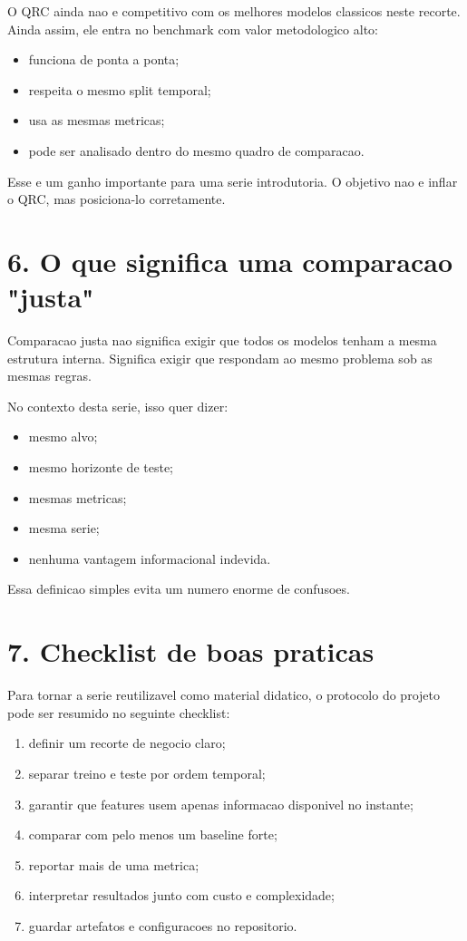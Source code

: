 \documentclass[12pt]{article}
\providecommand{\tightlist}{%
  \setlength{\itemsep}{0pt}\setlength{\parskip}{0pt}}
\begin{document}
O QRC ainda nao e competitivo com os melhores modelos classicos neste recorte. Ainda assim, ele entra no benchmark com valor metodologico alto:

\begin{itemize}
\tightlist
\item
  funciona de ponta a ponta;
\item
  respeita o mesmo split temporal;
\item
  usa as mesmas metricas;
\item
  pode ser analisado dentro do mesmo quadro de comparacao.
\end{itemize}

Esse e um ganho importante para uma serie introdutoria. O objetivo nao e inflar o QRC, mas posiciona-lo corretamente.

\section{6. O que significa uma comparacao "justa"}\label{6-o-que-significa-uma-comparacao-justa}

Comparacao justa nao significa exigir que todos os modelos tenham a mesma estrutura interna. Significa exigir que respondam ao mesmo problema sob as mesmas regras.

No contexto desta serie, isso quer dizer:

\begin{itemize}
\tightlist
\item
  mesmo alvo;
\item
  mesmo horizonte de teste;
\item
  mesmas metricas;
\item
  mesma serie;
\item
  nenhuma vantagem informacional indevida.
\end{itemize}

Essa definicao simples evita um numero enorme de confusoes.

\section{7. Checklist de boas praticas}\label{7-checklist-de-boas-praticas}

Para tornar a serie reutilizavel como material didatico, o protocolo do projeto pode ser resumido no seguinte checklist:

\begin{enumerate}
\def\labelenumi{\arabic{enumi}.}
\tightlist
\item
  definir um recorte de negocio claro;
\item
  separar treino e teste por ordem temporal;
\item
  garantir que features usem apenas informacao disponivel no instante;
\item
  comparar com pelo menos um baseline forte;
\item
  reportar mais de uma metrica;
\item
  interpretar resultados junto com custo e complexidade;
\item
  guardar artefatos e configuracoes no repositorio.
\end{enumerate}
\end{document}
